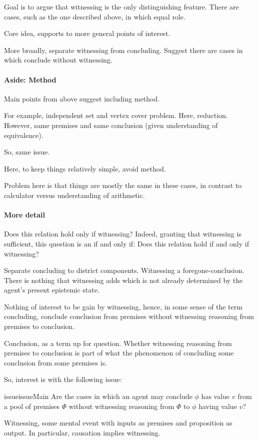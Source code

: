 {
  Goal is to argue that witnessing is the only distinguishing feature.
  There are cases, such as the one described above, in which equal role.

  Core idea, supports to more general points of interest.

  More broadly, separate witnessing from concluding.
  Suggest there are cases in which conclude without witnessing.
}

\paragraph*{Aside: Method}

\begin{note}
  Main points from above suggest including method.

  For example, independent set and vertex cover problem.
  Here, reduction.
  However, same premises and same conclusion (given understanding of equivalence).

  So, same issue.

  Here, to keep things relatively simple, avoid method.

  Problem here is that things are mostly the same in these cases, in contrast to calculator versus understanding of arithmetic. 
\end{note}

\paragraph*{More detail}

\begin{note}
  Does this relation hold only if witnessing?
  Indeed, granting that witnessing is sufficient, this question is an if and only if:
  Does this relation hold if and only if witnessing?

  Separate concluding to district components.
  Witnessing a foregone-conclusion.
  There is nothing that witnessing adds which is not already determined by the agent's present epistemic state.

  Nothing of interest to be gain by witnessing, hence, in some sense of the term concluding, conclude conclusion from premises without witnessing reasoning from premises to conclusion.

  Conclusion, as a term up for question.
  Whether witnessing reasoning from premises to conclusion is part of what the phenomenon of concluding some conclusion from some premises is.

  So, interest is with the following issue:

  \begin{restatable}{issue}{issueMain}
    \label{issue:Main}
    Are the cases in which an agent may conclude \(\phi\) has value \(v\) from a pool of premises \(\Phi\) without witnessing reasoning from \(\Phi\) to \(\phi\) having value \(v\)?
  \end{restatable}

  Witnessing, some mental event with inputs as premises and proposition as output.
  In particular, causation implies witnessing.
\end{note}


